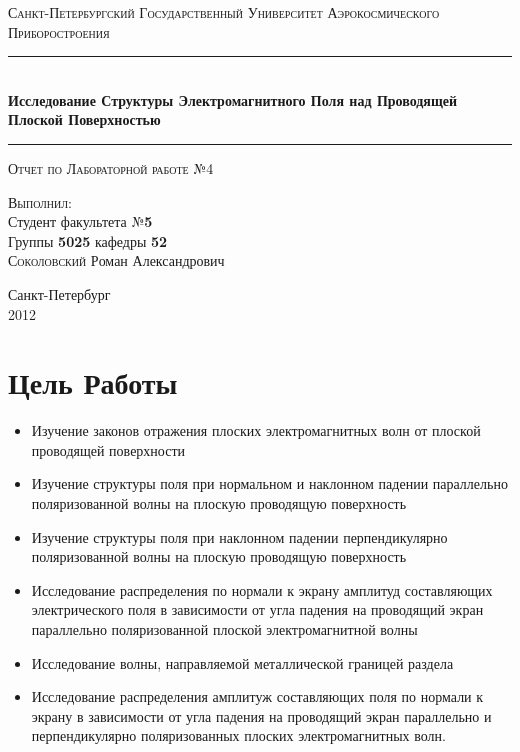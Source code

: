 \documentclass[11pt,a4paper,oneside, reqno]{amsproc}
\author{Соколовский Роман}
\begin{document}
\begin{titlepage}
    \begin{center}
        \textsc{\large Санкт-Петербургский Государственный Университет Аэрокосмического Приборостроения}\\[5cm]
        \rule{\textwidth}{1pt}\\
        \vspace{10pt}
        { \huge \bfseries Исследование Структуры Электромагнитного Поля 
        над Проводящей Плоской Поверхностью}\\[0.4cm]
        \hrule
        \vspace{0.4cm}
        \textsc{ {\large Отчет по Лабораторной работе №4}}
        
        \vspace{2.5cm}
        \begin{flushright}
        \begin{minipage}{0.5\textwidth}
            \begin{flushright} 
                \textsc{\small Выполнил}:\\
                \large
                Студент факультета №\textbf{5}\\
                Группы \textbf{5025} кафедры \textbf{52}\\[2pt]
                \textsc{Соколовский} \textsc{Р}оман \textsc{А}лександрович
            \end{flushright}
        \end{minipage}
        \end{flushright}
        \vfill
        {\large Санкт-Петербург\\2012}
    \end{center}
\end{titlepage}

\section{Цель Работы}
\begin{itemize}
    \item Изучение законов отражения плоских электромагнитных волн от плоской проводящей
        поверхности
    \item Изучение структуры поля при нормальном и наклонном падении параллельно
        поляризованной волны на плоскую проводящую поверхность
    \item Изучение структуры поля при наклонном падении перпендикулярно поляризованной волны
        на плоскую проводящую поверхность
    \item Исследование распределения по нормали к экрану амплитуд составляющих электрического
        поля в зависимости от угла падения на проводящий экран параллельно поляризованной
        плоской электромагнитной волны
    \item Исследование волны, направляемой металлической границей раздела
    \item Исследование распределения амплитуж составляющих поля по нормали к экрану в
        зависимости от угла падения на проводящий экран параллельно и перпендикулярно
        поляризованных плоских электромагнитных волн.\\
\end{itemize}
\end{document}
